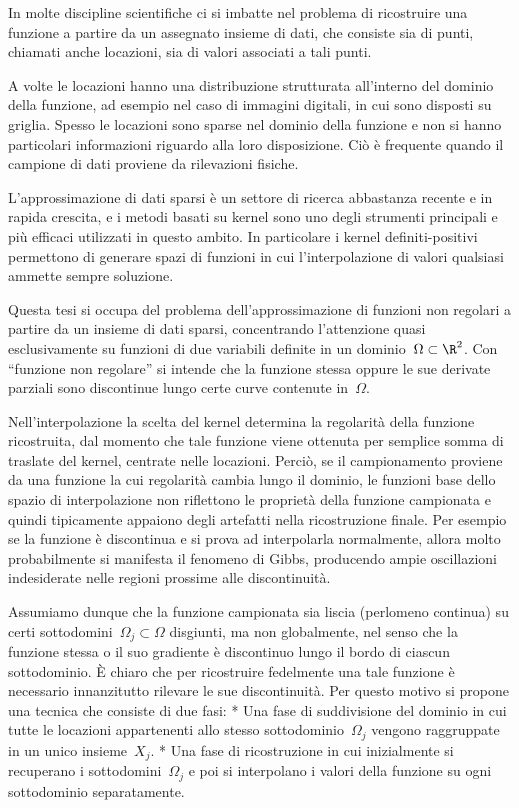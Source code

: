 

\vfill\eject

\itlang

\noindent In molte discipline scientifiche ci si imbatte nel problema di ricostruire una funzione a partire da un assegnato insieme di dati, che consiste sia di punti, chiamati anche locazioni, sia di valori associati  a tali punti.

A volte le locazioni hanno una distribuzione strutturata all'interno del dominio della funzione, ad esempio nel caso di immagini digitali, in cui sono disposti su griglia. Spesso le locazioni sono sparse nel dominio della funzione e non si hanno particolari informazioni riguardo alla loro disposizione. Ciò è frequente quando il campione di dati proviene da rilevazioni fisiche.

L'approssimazione di dati sparsi è un settore di ricerca abbastanza recente e in rapida crescita, e i metodi basati su kernel sono uno degli strumenti principali e più efficaci utilizzati in questo ambito. In particolare i kernel definiti-positivi permettono di generare spazi di funzioni in cui l'interpolazione di valori qualsiasi ammette sempre soluzione.

Questa tesi si occupa del problema dell'approssimazione di funzioni non regolari a partire da un insieme di dati sparsi, concentrando l'attenzione quasi esclusivamente su funzioni di due variabili definite in un dominio~$\Omega\subset\R^2$. Con ``funzione non regolare'' si intende che la funzione stessa oppure le sue derivate parziali sono discontinue lungo certe curve contenute in~$\Omega$.

Nell'interpolazione la scelta del kernel determina la regolarità della funzione ricostruita, dal momento che tale funzione viene ottenuta per semplice somma di traslate del kernel, centrate nelle locazioni.
Perciò, se il campionamento proviene da una funzione la cui regolarità cambia lungo il dominio, le funzioni base dello spazio di interpolazione non riflettono le proprietà della funzione campionata e quindi  tipicamente appaiono degli artefatti nella ricostruzione finale.  Per esempio se la funzione è discontinua e si prova  ad interpolarla normalmente, allora molto probabilmente si manifesta il fenomeno di Gibbs, producendo ampie oscillazioni indesiderate nelle regioni prossime alle discontinuità.  

Assumiamo dunque che la funzione campionata sia liscia (perlomeno continua) su certi sottodomini~$\Omega_j\subset \Omega$ disgiunti, ma non globalmente, nel senso che la funzione stessa o il suo gradiente è discontinuo lungo il bordo di ciascun sottodominio.
È chiaro che per ricostruire fedelmente una tale funzione è necessario innanzitutto rilevare le sue discontinuità.  Per questo motivo si propone una tecnica che consiste di due fasi:
\begitems
* Una fase di suddivisione del dominio in cui tutte le locazioni appartenenti allo stesso sottodominio~$\Omega_j$ vengono raggruppate in un unico insieme~$X_j$.
* Una fase di ricostruzione in cui inizialmente si recuperano i sottodomini~$\Omega_j$ e poi si interpolano i valori della funzione  su ogni sottodominio separatamente. 
\enditems 

